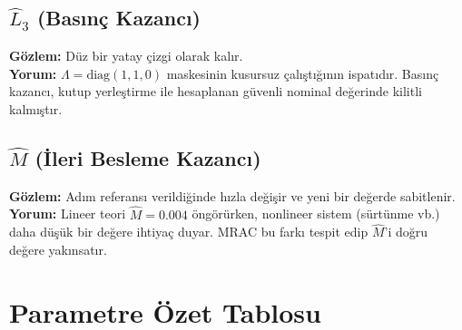 \documentclass[12pt,a4paper]{article}
\begin{document}
\subsection{$\hat{L}_3$ (Basınç Kazancı)}
\textbf{Gözlem:} Düz bir yatay çizgi olarak kalır.\\
\textbf{Yorum:} $\Lambda = \text{diag}(1,1,0)$ maskesinin kusursuz çalıştığının ispatıdır. Basınç kazancı, kutup yerleştirme ile hesaplanan güvenli nominal değerinde kilitli kalmıştır.

\subsection{$\hat{M}$ (İleri Besleme Kazancı)}
\textbf{Gözlem:} Adım referansı verildiğinde hızla değişir ve yeni bir değerde sabitlenir.\\
\textbf{Yorum:} Lineer teori $\hat{M} = 0.004$ öngörürken, nonlineer sistem (sürtünme vb.) daha düşük bir değere ihtiyaç duyar. MRAC bu farkı tespit edip $\hat{M}$'i doğru değere yakınsatır.

\section{Parametre Özet Tablosu}
\label{sec:summary_table}
\end{document}
